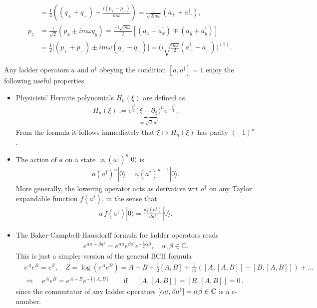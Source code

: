 \documentclass[../QFT_main.tex]{subfiles}
\begin{document}
\begin{mytheorem}
\begin{align}
    &=\frac{1}{2}\left((q_++q_-)+\tfrac{i(p_+-p_-)}{m\omega}\right)
    = \frac{1}{\sqrt{2m\omega}}(a_+ + a_-^\dagger),
    \\
    p_z &= \frac{1}{\sqrt{2}}\left(p_x \pm i m \omega q_y\right) = \frac{-i\sqrt{m\omega}}{2}\left[(a_x - a_x^\dagger) \mp (a_y + a_y^\dagger)\right]
    \\
    &= \frac{1}{2}\big[(p_+ + p_-) \pm i m \omega (q_+ - q_-)\big] = \Big(i \sqrt{\frac{m\omega}{2}} ( a_+^\dagger-a_-)\Big)^{(\dagger)}.
\end{align}
%
\end{mytheorem}



\begin{mytheorem}
%
Any ladder operators $a$ and $a^\dagger$ obeying the condition $[a, a^\dagger] = 1$ enjoy the following useful properties.
\begin{itemize}
    \item Physicists' Hermite polynomials $H_n(\xi)$ are defined as
    \begin{align}
        H_n(\xi):= e^{\frac{\xi^2}{2}}\Big(\underbrace{\xi-\partial_\xi}_{=\sqrt{2}\,a^\dagger}\big)^n e^{-\frac{\xi^2}{2}}\,.
    \end{align}
    From the formula it follows immediately that $\xi \mapsto H_n(\xi)$ has parity $(-1)^n$.
    \item The action of $a$ on a state $\propto \left(a^\dagger\right)^n |0\rangle$ is
    \begin{align}
        a \left(a^\dagger\right)^n |0\rangle = n \left(a^\dagger\right)^{n-1} |0\rangle.
    \end{align}
    More generally, the lowering operator acts as derivative wrt $a^\dagger$ on any Taylor expandable function $f(a^\dagger)$, in the sense that
    \begin{align}
        a \, f(a^\dagger) |0\rangle = \tfrac{d f(a^\dagger)}{d a^\dagger} |0\rangle.
    \end{align}
    \item The Baker-Campbell-Hausdorff formula for ladder operators reads
    \begin{align}
        e^{\alpha a + \beta a^\dagger} = e^{\alpha a} e^{\beta a^\dagger} e^{-\frac{1}{2} \alpha \beta}, \quad \alpha, \beta \in \mathbb{C}.
    \end{align}
    This is just a simpler version of the general BCH formula 
    \begin{align}
        &e^A e^B = e^Z, \quad Z = \log(e^A e^B)= A + B + \tfrac{1}{2}[A,B] + \tfrac{1}{12}([A,[A,B]] - [B,[A,B]]) + \ldots
        \\[5pt]
        &\Rightarrow \quad e^A e^B = e^{A+B} e^{+\frac{1}{2}[A,B]} \qquad \text{if }\quad  [A,[A,B]] = [B,[A,B]] = 0\,.
    \end{align}
    since the commutator of any ladder operators $[\alpha a, \beta a^\dagger] = \alpha \beta\in\mathbb{C}$ is a c-number.
\end{itemize}
\end{mytheorem}
\end{document}
